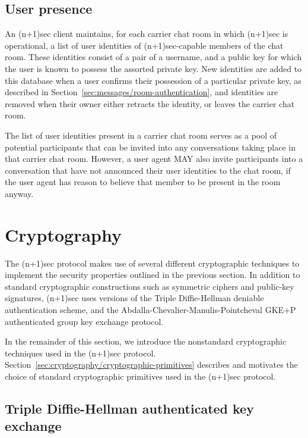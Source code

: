 \documentclass{article}
\begin{document}
\subsection{User presence}
\label{sec:carrier-chat-rooms/user-presence}

An (n+1)sec client maintains, for each carrier chat room in which (n+1)sec is operational, a list of user identities of (n+1)sec-capable members of the chat room.
These identities consist of a pair of a username, and a public key for which the user is known to possess the assorted private key.
New identities are added to this database when a user confirms their possession of a particular private key, as described in Section~\ref{sec:messages/room-authentication}, and identities are removed when their owner either retracts the identity, or leaves the carrier chat room.

The list of user identities present in a carrier chat room serves as a pool of potential participants that can be invited into any conversations taking place in that carrier chat room.
However, a user agent MAY also invite participants into a conversation that have not announced their user identities to the chat room, if the user agent has reason to believe that member to be present in the room anyway.



\section{Cryptography}
\label{sec:cryptography}

The (n+1)sec protocol makes use of several different cryptographic techniques to implement the security properties outlined in the previous section.
In addition to standard cryptographic constructions such as symmetric ciphers and public-key signatures, (n+1)sec uses versions of the Triple Diffie-Hellman deniable authentication scheme, and the Abdalla-Chevalier-Manulis-Pointcheval GKE+P authenticated group key exchange protocol.

In the remainder of this section, we introduce the nonstandard cryptographic techniques used in the (n+1)sec protocol.
Section~\ref{sec:cryptography/cryptographic-primitives} describes and motivates the choice of standard cryptographic primitives used in the (n+1)sec protocol.


\subsection{Triple Diffie-Hellman authenticated key exchange}
\label{sec:cryptography/triple-diffie-hellman}
\end{document}
